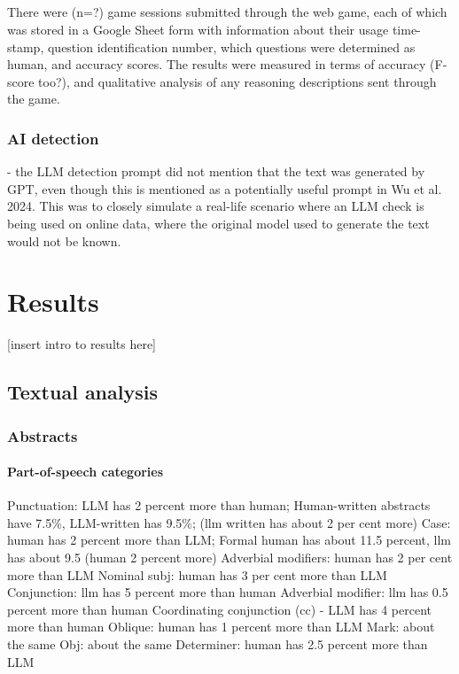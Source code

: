 \documentclass[thesis]{cluu}
\begin{document}
\paragraph{}
There were (n=?) game sessions submitted through the web game,
each of which was stored in a Google Sheet form with information
about their usage time-stamp, question identification number,
which questions were determined as human, and accuracy scores.
The results were measured in terms of accuracy (F-score too?),
and qualitative analysis of any reasoning descriptions sent
through the game.

\subsection{AI detection}

- the LLM detection prompt did not mention that the text was generated by GPT, even though this is mentioned as a potentially useful prompt in Wu et al. 2024. This was to closely simulate a real-life
scenario where an LLM check is being used on online data, where the original model used to generate the text would not be known.

\chapter{Results}
[insert intro to results here]
\section{Textual analysis}
\subsection{Abstracts}
\subsubsection{Part-of-speech categories}
Punctuation: LLM has 2 percent more than human; Human-written abstracts have 7.5\%, LLM-written has 9.5\%; (llm written has about 2 per cent more)
Case: human has 2 percent more than LLM; Formal human has about 11.5 percent, llm has about 9.5 (human 2 percent more)
Adverbial modifiers: human has 2 per cent more than LLM
Nominal subj: human has 3 per cent more than LLM
Conjunction: llm has 5 percent more than human
Adverbial modifier: llm has 0.5 percent more than human
Coordinating conjunction (cc) - LLM has 4 percent more than human
Oblique: human has 1 percent more than LLM
Mark: about the same
Obj: about the same
Determiner: human has 2.5 percent more than LLM
\end{document}
